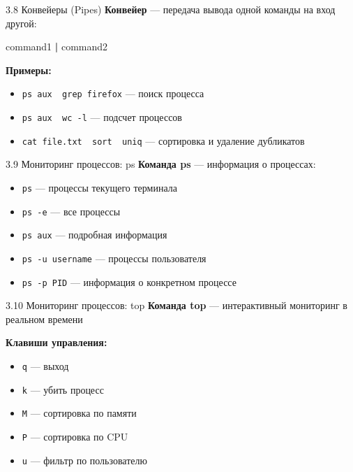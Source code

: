 \documentclass[
  ignorenonframetext,
  aspectratio=169,
  russian,
]{beamer}
\newenvironment{Shaded}{\begin{snugshade}}{\end{snugshade}}
\newcommand{\ExtensionTok}[1]{\textcolor[rgb]{0.00,0.23,0.31}{#1}}
\newcommand{\KeywordTok}[1]{\textcolor[rgb]{0.00,0.23,0.31}{\textbf{#1}}}
\providecommand{\tightlist}{%
  \setlength{\itemsep}{0pt}\setlength{\parskip}{0pt}}
\begin{document}
\begin{frame}[fragile]{3.8 Конвейеры (Pipes)}
\label{ux43aux43eux43dux432ux435ux439ux435ux440ux44b-pipes}
\textbf{Конвейер} --- передача вывода одной команды на вход другой:

\begin{Shaded}
\begin{Highlighting}[]
\ExtensionTok{command1} \KeywordTok{|} \ExtensionTok{command2}
\end{Highlighting}
\end{Shaded}

\textbf{Примеры:}

\begin{itemize}[<+->]
\tightlist
\item
  \texttt{ps\ aux\ \textbar{}\ grep\ firefox} --- поиск процесса
\item
  \texttt{ps\ aux\ \textbar{}\ wc\ -l} --- подсчет процессов
\item
  \texttt{cat\ file.txt\ \textbar{}\ sort\ \textbar{}\ uniq} ---
  сортировка и удаление дубликатов
\end{itemize}
\end{frame}

\begin{frame}[fragile]{3.9 Мониторинг процессов: ps}
\label{ux43cux43eux43dux438ux442ux43eux440ux438ux43dux433-ux43fux440ux43eux446ux435ux441ux441ux43eux432-ps}
\textbf{Команда ps} --- информация о процессах:

\begin{itemize}[<+->]
\tightlist
\item
  \texttt{ps} --- процессы текущего терминала
\item
  \texttt{ps\ -e} --- все процессы
\item
  \texttt{ps\ aux} --- подробная информация
\item
  \texttt{ps\ -u\ username} --- процессы пользователя
\item
  \texttt{ps\ -p\ PID} --- информация о конкретном процессе
\end{itemize}
\end{frame}

\begin{frame}[fragile]{3.10 Мониторинг процессов: top}
\label{ux43cux43eux43dux438ux442ux43eux440ux438ux43dux433-ux43fux440ux43eux446ux435ux441ux441ux43eux432-top}
\textbf{Команда top} --- интерактивный мониторинг в реальном времени

\textbf{Клавиши управления:}

\begin{itemize}[<+->]
\tightlist
\item
  \texttt{q} --- выход
\item
  \texttt{k} --- убить процесс
\item
  \texttt{M} --- сортировка по памяти
\item
  \texttt{P} --- сортировка по CPU
\item
  \texttt{u} --- фильтр по пользователю
\end{itemize}
\end{frame}
\end{document}
